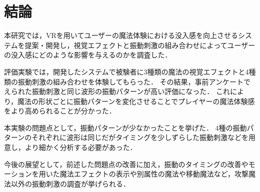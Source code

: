 \chapter{結論}
本研究では，VRを用いてユーザーの魔法体験における没入感を向上させるシステムを提案・開発し，視覚エフェクトと振動刺激の組み合わせによってユーザーの没入感にどのような影響を与えるのかを調査した．

評価実験では，開発したシステムで被験者に3種類の魔法の視覚エフェクトと4種類の振動刺激の組み合わせを体験してもらった．
その結果，事前アンケートでえられた振動刺激と同じ波形の振動パターンが高い評価になった．
これにより，魔法の形状ごとに振動パターンを変化させることでプレイヤーの魔法体験感をより高められることが分かった．

本実験の問題点として，振動パターンが少なかったことを挙げた．
4種の振動パターンのそれぞれに波形は同じだがタイミングを少しずらした振動刺激などを用意し，より細かく分析する必要があった．

今後の展望として，前述した問題点の改善に加え，振動のタイミングの改善やモーションを用いた魔法エフェクトの表示や別属性の魔法や移動魔法など，攻撃魔法以外の振動刺激の調査が挙げられる．
  